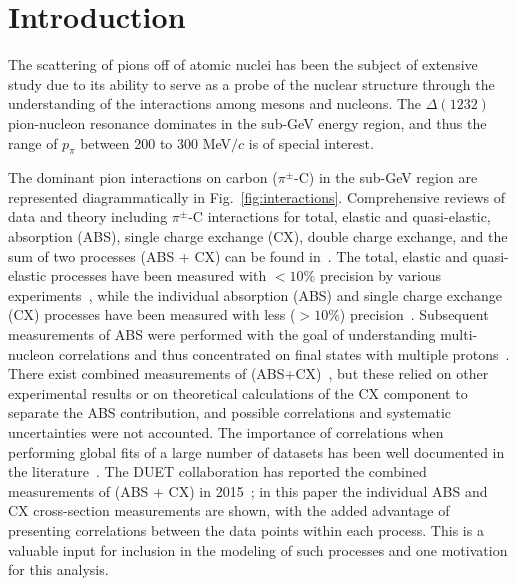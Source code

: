 \section{\label{sec:intro}Introduction\protect}
The scattering of pions off of atomic nuclei has been the subject of extensive study
due to its ability to serve as a probe of the nuclear structure 
through the understanding of the interactions among mesons and nucleons. The $\Delta(1232)$ pion-nucleon resonance dominates in the sub-GeV energy region, and thus the range of $p_{\pi}$ between 200 to 300 MeV$/c$ is of special interest.


The dominant pion interactions on carbon ($\pi^{\pm}$-C) in the sub-GeV region are represented diagrammatically in Fig.~\ref{fig:interactions}. Comprehensive reviews of data and theory including $\pi^{\pm}$-C interactions for total, elastic and quasi-elastic, absorption (ABS), single charge exchange (CX), double charge exchange, and the sum of two processes (ABS + CX) can be found in~\cite{review1,review2}. The total, elastic and quasi-elastic processes have been measured with $<10\%$ precision by various experiments~\cite{Allardyce,Binon,Gelderloos,Meirav,Moinester,Levenson,Ashery,Saunders1996,Jones1993}, while the individual absorption (ABS) and single charge exchange (CX) processes have been measured with less ($>10\%$) precision~\cite{Jones1993,Ashery2,Hilscher,Bowles,Bellotti1973,Bellotti1973_2}. Subsequent measurements of ABS were performed with the goal of understanding multi-nucleon correlations and thus concentrated on final states with multiple protons~\cite{Ransome1992,Jones1993,Gianelli2000}. There exist combined measurements of (ABS+CX)~\cite{Saunders1996,Ashery,Miller,navon,navon2}, but these relied on other experimental results or on theoretical calculations of the CX component to separate the ABS contribution, and possible correlations and systematic uncertainties were not accounted. The importance of correlations when performing global fits of a large number of datasets has been well documented in the literature~\cite{Pumplin,Stump,niwgPaper}. The DUET collaboration has reported the combined measurements of (ABS + CX) in 2015~\cite{duet}; in this paper the individual ABS and CX cross-section measurements are shown, with the added advantage of presenting correlations between the data points within each process. This is a valuable input for inclusion in the modeling of such processes and one motivation for this analysis.

